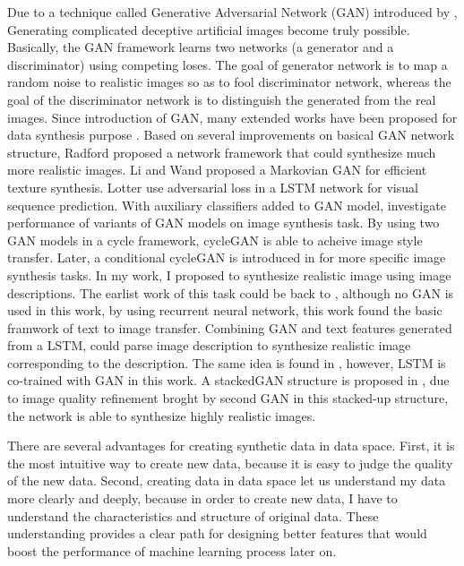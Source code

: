\documentclass{iitthesis}
\begin{document}
Due to a technique called Generative Adversarial Network (GAN) introduced by \cite{goodfellow2014generative}, Generating complicated deceptive artificial images become truly possible. Basically, the GAN framework learns two networks (a generator and a discriminator) using competing loses. The goal of generator network is to map a random noise to realistic images so as to fool discriminator network, whereas the goal of the discriminator network is to distinguish the generated from the real images. Since introduction of GAN, many extended works have been proposed for data synthesis purpose \cite{salimans2016improved}. Based on several improvements on basical GAN network structure, Radford \cite{radford2015unsupervised} proposed a network framework that could synthesize much more realistic images. Li and Wand \cite{johnson2016perceptual} proposed a Markovian GAN for efficient texture synthesis. Lotter use adversarial loss in a LSTM network for visual sequence prediction. With auxiliary classifiers added to GAN model, \cite{odena2016conditional} investigate performance of variants of GAN models on image synthesis task. By using two GAN models in a cycle framework, cycleGAN \cite{zhu2017unpaired} is able to acheive image style transfer. Later, a conditional cycleGAN is introduced in \cite{lu2017conditional} for more specific image synthesis tasks. In my work, I proposed to synthesize realistic image using image descriptions. The earlist work of this task could be back to \cite{mansimov2015generating}, although no GAN is used in this work, by using recurrent neural network, this work found the basic framwork of text to image transfer. Combining GAN and text features generated from a LSTM, \cite{reed2016generative} could parse image description to synthesize realistic image corresponding to the description. The same idea is found in \cite{DBLP:journals/corr/DongZMG17}, however, LSTM is co-trained with GAN in this work. A stackedGAN structure is proposed in \cite{zhang2016stackgan}, due to image quality refinement broght by second GAN in this stacked-up structure, the network is able to synthesize highly realistic images.


 \label{dataspace: solution}

There are several advantages for creating synthetic data in data space. First, it is the most intuitive way to create new data, because it is easy to judge the quality of the new data. Second, creating data in data space let us understand my data more clearly and deeply, because in order to create new data, I have to understand the characteristics and structure of original data. These understanding provides a clear path for designing better features that would boost the performance of machine learning process later on. 
\end{document}
